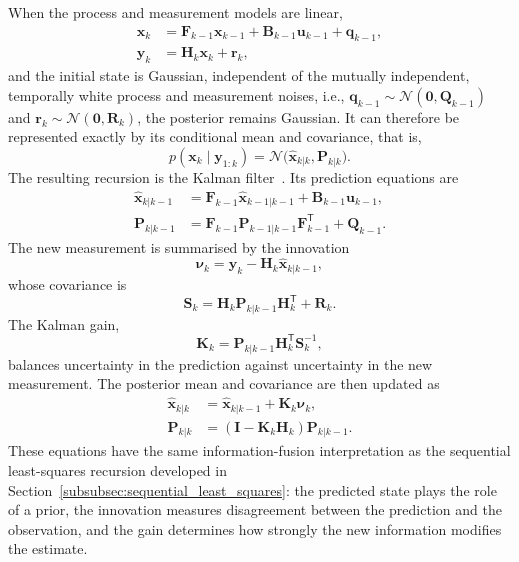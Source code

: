 When the process and measurement models are linear,
\begin{subequations}
\begin{align}
\mathbf{x}_k &= \mathbf{F}_{k-1}\mathbf{x}_{k-1} +\mathbf{B}_{k-1}\mathbf{u}_{k-1} + \mathbf{q}_{k-1}, \label{eq:kf_linear_process}\\
\mathbf{y}_k &= \mathbf{H}_k\mathbf{x}_k+\mathbf{r}_k,
\label{eq:kf_linear_measurement}
\end{align}    
\end{subequations}
and the initial state is Gaussian, independent of the mutually independent, temporally white process and measurement noises, i.e., $\mathbf{q}_{k-1}\sim \mathcal{N}(\mathbf{0},\mathbf{Q}_{k-1})$ and $\mathbf{r}_k\sim \mathcal{N}(\mathbf{0},\mathbf{R}_k)$, the posterior remains Gaussian. It can therefore be represented exactly by its conditional mean and covariance, that is,
\begin{equation}
p(\mathbf{x}_k\mid\mathbf{y}_{1:k}) = \mathcal{N} \bigl(\widehat{\mathbf{x}}_{k|k}, \mathbf{P}_{k|k} \bigr).
\end{equation}
The resulting recursion is the Kalman filter~\cite{kalman_1960}. Its
prediction equations are
\begin{align}
\widehat{\mathbf{x}}_{k|k-1}
&=
\mathbf{F}_{k-1}\widehat{\mathbf{x}}_{k-1|k-1}
+
\mathbf{B}_{k-1}\mathbf{u}_{k-1},
\label{eq:kf_state_prediction}\\
\mathbf{P}_{k|k-1}
&=
\mathbf{F}_{k-1}\mathbf{P}_{k-1|k-1}
\mathbf{F}_{k-1}^{\mathsf T}
+
\mathbf{Q}_{k-1}.
\label{eq:kf_cov_prediction}
\end{align}
The new measurement is summarised by the innovation
\begin{equation}
\boldsymbol{\nu}_k
=
\mathbf{y}_k-
\mathbf{H}_k\widehat{\mathbf{x}}_{k|k-1},
\label{eq:kf_innovation}
\end{equation}
whose covariance is
\begin{equation}
\mathbf{S}_k
=
\mathbf{H}_k\mathbf{P}_{k|k-1}\mathbf{H}_k^{\mathsf T}
+
\mathbf{R}_k.
\label{eq:kf_innovation_covariance}
\end{equation}
The Kalman gain,
\begin{equation}
\mathbf{K}_k
=
\mathbf{P}_{k|k-1}\mathbf{H}_k^{\mathsf T}
\mathbf{S}_k^{-1},
\label{eq:kf_gain}
\end{equation}
balances uncertainty in the prediction against uncertainty in the new
measurement. The posterior mean and covariance are then updated as
\begin{align}
\widehat{\mathbf{x}}_{k|k} &= \widehat{\mathbf{x}}_{k|k-1} + \mathbf{K}_k\boldsymbol{\nu}_k, \label{eq:kf_state_update}\\
\mathbf{P}_{k|k} &= (\mathbf{I}-\mathbf{K}_k\mathbf{H}_k) \mathbf{P}_{k|k-1}. \label{eq:kf_cov_update}
\end{align} 
These equations have the same information-fusion interpretation as the sequential least-squares recursion developed in Section~\ref{subsubsec:sequential_least_squares}: the predicted state plays the role of a prior, the innovation measures disagreement between the prediction and the observation, and the gain determines how strongly the new information modifies the estimate.

